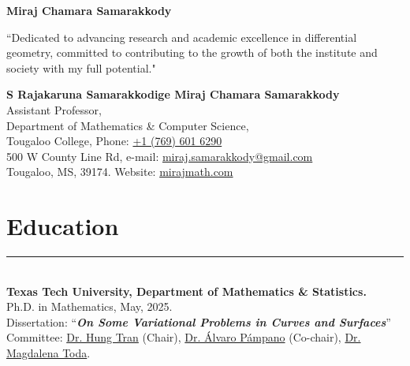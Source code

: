 \documentclass[12pt]{book}
\begin{document}
\pagestyle{fancy}
\thispagestyle{empty}
\begin{center}
\textbf{\Huge{Miraj Chamara Samarakkody}}\\
\end{center}

``Dedicated to advancing research and academic excellence in differential geometry, committed to contributing to the growth of both the institute and society with my full potential."\\
\vspace{0.05in}

\noindent \textbf{S Rajakaruna Samarakkodige Miraj Chamara Samarakkody}\\
Assistant Professor,  \\
Department of Mathematics \& Computer Science,    \\
Tougaloo College, \hfill Phone: \href{tel:+17696016290}{+1 (769) 601 6290}\\
500 W County Line Rd,  \hfill e-mail: \href{mailto:miraj.samarakkody@gmail.com}{miraj.samarakkody@gmail.com}\\
Tougaloo, MS, 39174.  \hfill Website: \href{https://mirajmath.com}{mirajmath.com}\\



\section*{Education} \rule{\textwidth}{1pt}\\

\noindent \textbf{Texas Tech University, Department of Mathematics \& Statistics.}\\
Ph.D. in Mathematics, May, 2025. \\
Dissertation: ``\textit{\textbf{On Some Variational Problems in Curves and Surfaces}}''\\
Committee:  \href{https://www.myweb.ttu.edu/tra97432/}{Dr. Hung Tran} (Chair), \href{https://www.math.ttu.edu/~apampano/}{Dr. \'Alvaro P\'ampano} (Co-chair), \href{https://www.math.ttu.edu/~mtoda/}{Dr. Magdalena Toda}.\\
\end{document}
